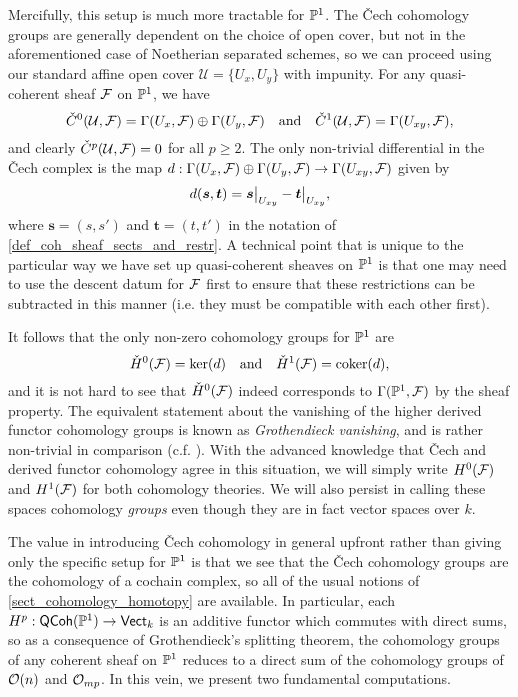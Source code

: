 Mercifully, this setup is much more tractable for $\mathbb{P}^{{1}}$.
The \v{C}ech cohomology groups are generally dependent on the choice
of open cover, but not in the aforementioned case of Noetherian
separated schemes, so we can proceed using our standard affine open
cover $\mathcal{U} = \{U_x, U_y\}$ with impunity.
For any quasi-coherent sheaf $\mathcal{F}$ on $\mathbb{P}^{{1}}$, we have
\[
  \check{C}^{0}({\mathcal{U}}, {\mathcal{F}}) = \Gamma({U_x}, {\mathcal{F}})
  \oplus \Gamma({U_y}, {\mathcal{F}})
  \quad \text{and} \quad
  \check{C}^{1}({\mathcal{U}}, {\mathcal{F}}) = \Gamma({U_{xy}}, {\mathcal{F}}),
\]
and clearly $\check{C}^{p}({\mathcal{U}}, {\mathcal{F}}) = 0$ for all $p \geq 2$.
The only non-trivial differential in the \v{C}ech complex is the map
$d: \Gamma({U_x}, {\mathcal{F}}) \oplus \Gamma({U_y}, {\mathcal{F}}) \to
\Gamma({U_{xy}}, {\mathcal{F}})$ given by
\[
  d(\bm{s}, \bm{t}) = \setres{\bm{s}}{U_{xy}} - \setres{\bm{t}}{U_{xy}},
\]
where $\bm{s} = (s, s')$ and $\bm{t} = (t, t')$ in the notation of
\cref{def_coh_sheaf_sects_and_restr}.
A technical point that is unique to the particular way we have set up
quasi-coherent sheaves on $\mathbb{P}^{{1}}$ is that one may need to use the
descent datum for $\mathcal{F}$ first to ensure that these restrictions
can be subtracted in this manner (i.e. they must be compatible with
each other first).

It follows that the only non-zero cohomology groups for $\mathbb{P}^{{1}}$ are
\[
  \check{H}^{0}({\mathcal{F}}) = \ker(d)
  \quad \text{and} \quad
  \check{H}^{1}({\mathcal{F}}) = \operatorname{coker}(d),
\]
and it is not hard to see that $\check{H}^{0}({\mathcal{F}})$ indeed
corresponds to $\Gamma({\mathbb{P}^{{1}}}, {\mathcal{F}})$ by the sheaf property.
The equivalent statement about the vanishing of the higher derived
functor cohomology groups is known as \emph{Grothendieck vanishing},
and is rather non-trivial in comparison (c.f.
\cite[Proposition~20.20.7]{stacks}).
With the advanced knowledge that \v{C}ech and derived functor
cohomology agree in this situation, we will simply write
$H^0(\mathcal{F})$ and $H^1(\mathcal{F})$ for both cohomology theories.
We will also persist in calling these spaces cohomology \emph{groups}
even though they are in fact vector spaces over $k$.

The value in introducing \v{C}ech cohomology in general upfront
rather than giving only the specific setup for $\mathbb{P}^{{1}}$ is that we
see that the \v{C}ech cohomology groups are the cohomology of a
cochain complex, so all of the usual notions of
\cref{sect_cohomology_homotopy} are available.
In particular, each $H^p: \operatorname{\mathsf{QCoh}}(\mathbb{P}^{{1}}) \to {\mathsf{Vect}}_{{k}}$ is an
additive functor which commutes with direct sums, so as a consequence
of Grothendieck's splitting theorem, the cohomology groups of any
coherent sheaf on $\mathbb{P}^{{1}}$ reduces to a direct sum of the
cohomology groups of $\mathcal{O}({n})$ and $\mathcal{O}_{{mp}}$.
In this vein, we present two fundamental computations.

